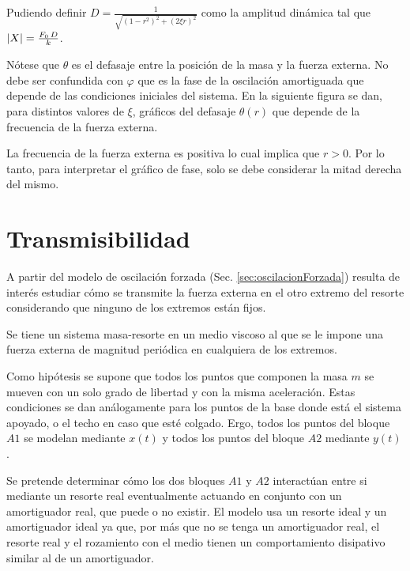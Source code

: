 \documentclass[a5paper,12pt,twoside]{book}
\begin{document}
Pudiendo definir $D=\frac{1}{\sqrt{(1-r^2)^2+(2 \xi r)^2}}$ como la amplitud dinámica tal que ${\left| {X} \right|}=\frac{F_0 \, D}{k}$.

Nótese que $\theta$ es el defasaje entre la posición de la masa y la fuerza externa.
No debe ser confundida con $\varphi$ que es la fase de la oscilación amortiguada que depende de las condiciones iniciales del sistema.
En la siguiente figura se dan, para distintos valores de $\xi$, gráficos del defasaje $\theta(r)$ que depende de la frecuencia de la fuerza externa.

\begin{center}
    \def\svgwidth{\linewidth}
    
\end{center}

La frecuencia de la fuerza externa es positiva lo cual implica que $r>0$.
Por lo tanto, para interpretar el gráfico de fase, solo se debe considerar la mitad derecha del mismo.


\section{Transmisibilidad}

A partir del modelo de oscilación forzada (Sec. \ref{sec:oscilacionForzada}) resulta de interés estudiar cómo se transmite la fuerza externa en el otro extremo del resorte considerando que ninguno de los extremos están fijos.

Se tiene un sistema masa-resorte en un medio viscoso al que se le impone una fuerza externa de magnitud periódica en cualquiera de los extremos.

\begin{center}
    \def\svgwidth{0.8\linewidth}
    
\end{center}

Como hipótesis se supone que todos los puntos que componen la masa $m$ se mueven con un solo grado de libertad y con la misma aceleración.
Estas condiciones se dan análogamente para los puntos de la base donde está el sistema apoyado, o el techo en caso que esté colgado.
Ergo, todos los puntos del bloque $A1$ se modelan mediante $x(t)$ y todos los puntos del bloque $A2$ mediante $y(t)$.

Se pretende determinar cómo los dos bloques $A1$ y $A2$ interactúan entre si mediante un resorte real eventualmente actuando en conjunto con un amortiguador real, que puede o no existir.
El modelo usa un resorte ideal y un amortiguador ideal ya que, por más que no se tenga un amortiguador real, el resorte real y el rozamiento con el medio tienen un comportamiento disipativo similar al de un amortiguador.
\end{document}
